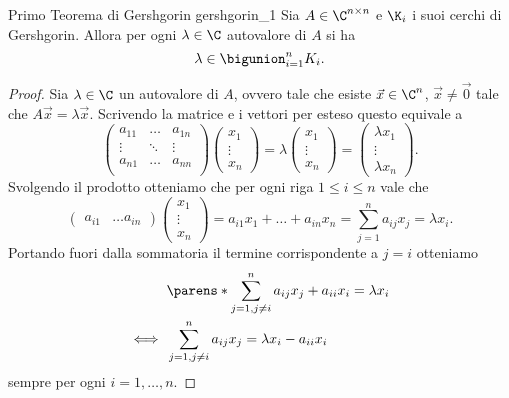\begin{theorem}
    {Primo Teorema di Gershgorin}
    {gershgorin_1}
    Sia $A \in \Mat{\C, n, n}$ e $\K_i$ i suoi cerchi di Gershgorin. Allora per ogni $\lambda \in \C$ autovalore di $A$ si ha \[
        \lambda \in \bigunion_{i=1}^n K_i.
    \]
\end{theorem}
\begin{proof}
    Sia $\lambda \in \C$ un autovalore di $A$, ovvero tale che esiste $\vec x \in \C^n$, $\vec x \neq \vec 0$ tale che $A\vec x = \lambda\vec x$. Scrivendo la matrice e i vettori per esteso questo equivale a \[
        \begin{pmatrix}
            a_{11} &\dots  &a_{1n} \\
            \vdots &\ddots &\vdots \\
            a_{n1} &\dots  &a_{nn} \\
        \end{pmatrix} \begin{pmatrix}
            x_1 \\ \vdots \\ x_n
        \end{pmatrix} = \lambda \begin{pmatrix}
            x_1 \\ \vdots \\ x_n
        \end{pmatrix} = \begin{pmatrix}
            \lambda x_1 \\ \vdots \\ \lambda x_n    
        \end{pmatrix}.
    \] Svolgendo il prodotto otteniamo che per ogni riga $1 \leq i \leq n$ vale che \[
        \begin{pmatrix}
            a_{i1} &\dots a_{in}
        \end{pmatrix} \begin{pmatrix}
            x_1 \\ \vdots \\ x_n
        \end{pmatrix} = a_{i1}x_1 + \dots + a_{in}x_n 
        = \sum_{j=1}^n a_{ij}x_j
        = \lambda x_i.
    \] Portando fuori dalla sommatoria il termine corrispondente a $j = i$ otteniamo \begin{align*}
        &\parens*{\sum_{j=1, j\neq i}^n a_{ij}x_j} + a_{ii}x_i = \lambda x_i\\
        \iff {}&\sum_{j=1, j\neq i}^n a_{ij}x_j =  \lambda x_i - a_{ii}x_i
    \end{align*} sempre per ogni $i = 1, \dots, n$.
    

\end{proof}
